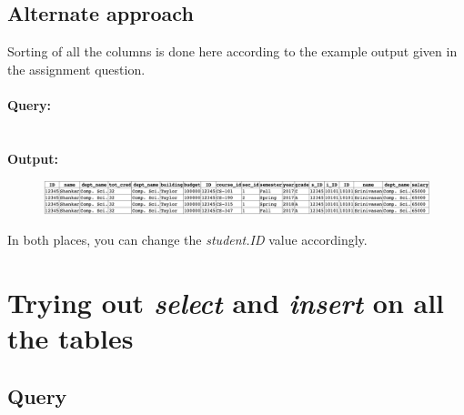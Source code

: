 \documentclass[12pt]{article}
\begin{document}
\subsection{Alternate approach}
Sorting of all the columns is done here according to the example output given in the assignment question.
\\ \\
\textbf{Query:} \\
\\ \\
\textbf{Output:}
\begin{figure}[hbt]
    \centering
    \includegraphics[scale=0.47]{screenshots/problem2b.png}
    \label{fig:my_label1}
\end{figure}

{\noindent In both places, you can change the \textit{student.ID} value accordingly.}


\section{Trying out \textit{select} and \textit{insert} on all the tables}
\subsection{Query}

\newpage
\end{document}
